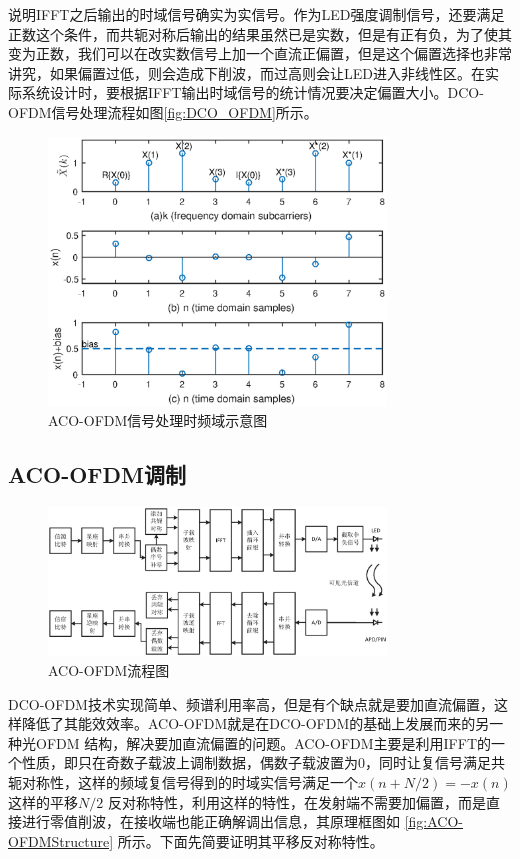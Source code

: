 说明IFFT之后输出的时域信号确实为实信号。作为LED强度调制信号，还要满足正数这个条件，而共轭对称后输出的结果虽然已是实数，但是有正有负，为了使其变为正数，我们可以在改实数信号上加一个直流正偏置，但是这个偏置选择也非常讲究，如果偏置过低，则会造成下削波，而过高则会让LED进入非线性区。在实际系统设计时，要根据IFFT输出时域信号的统计情况要决定偏置大小。DCO-OFDM信号处理流程如图\autoref{fig:DCO_OFDM}所示。
\begin{figure}[htbp]
    \centering
    \includegraphics[width=0.8\textwidth]{figures/chapter-2/DCO_OFDM.eps}
    \caption{ACO-OFDM信号处理时频域示意图}
    \label{fig:DCO_OFDM}
\end{figure}

\subsection{ACO-OFDM调制}

\begin{figure}[h]
    \centering
    \includegraphics[width=0.8\textwidth]{figures/chapter-2/ACO-OFDMStructure.eps}
    \caption{ACO-OFDM流程图}
    \label{fig:ACO-OFDMStructure}
\end{figure}
DCO-OFDM技术实现简单、频谱利用率高，但是有个缺点就是要加直流偏置，这样降低了其能效效率。ACO-OFDM就是在DCO-OFDM的基础上发展而来的另一种光OFDM 结构，解决要加直流偏置的问题。ACO-OFDM主要是利用IFFT的一个性质，即只在奇数子载波上调制数据，偶数子载波置为0，同时让复信号满足共轭对称性，这样的频域复信号得到的时域实信号满足一个$x(n+N/2)=-x(n)$这样的平移$N/2$ 反对称特性，利用这样的特性，在发射端不需要加偏置，而是直接进行零值削波，在接收端也能正确解调出信息，其原理框图如
\autoref{fig:ACO-OFDMStructure} 所示。下面先简要证明其平移反对称特性。

